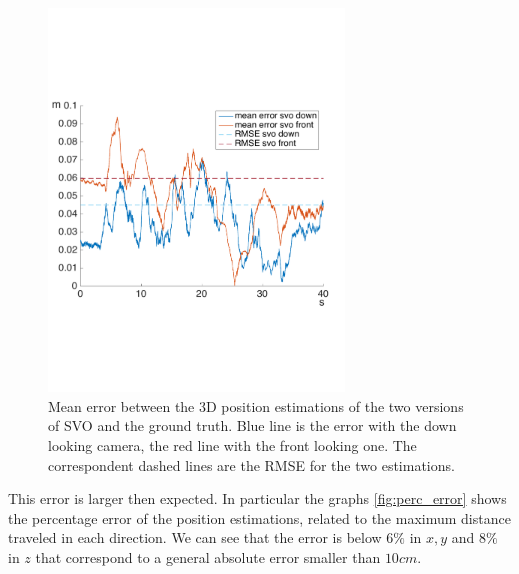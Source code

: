 \begin{figure}[!ht]
    \centering
    \includegraphics[width=0.7\textwidth]{img/comparision_between_two_svo_and_opti_error.pdf}
    \caption{Mean error between the 3D position estimations of the two versions of SVO and the ground truth. Blue line is the error with the down looking camera, the red line with the front looking one. The correspondent dashed lines are the RMSE for the two estimations.}
    \label{fig:comparision_svo_error}
\end{figure}

This error is larger then expected. In particular the graphs \ref{fig:perc_error} shows the percentage error of the position estimations, related to the maximum distance traveled in each direction. We can see that the error is below $6\%$ in $x,y$ and $8\%$ in $z$ that correspond to a general absolute error smaller than $10cm$.

